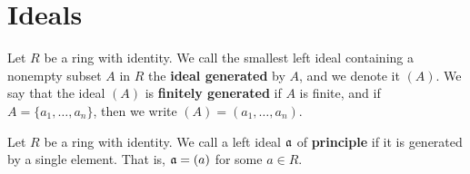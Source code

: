 \section{Ideals}
\label{section_5.4}

\begin{definition}
  Let $R$ be a ring with identity. We call the smallest left ideal
  containing a nonempty subset $A$ in $R$ the \textbf{ideal generated} by
  $A$, and we denote it $(A)$. We say that the ideal $(A)$ is
  \textbf{finitely generated} if $A$ is finite, and if
  $A=\{a_1, \dots, a_n\}$, then we write $(A)=(a_1, \dots, a_n)$.
\end{definition}

\begin{definition}
  Let $R$ be a ring with identity. We call a left ideal $\mathfrak{a}$
  of \textbf{principle} if it is generated by a single element. That
  is, $\mathfrak{a}=(a)$ for some $a \in R$.
\end{definition}

